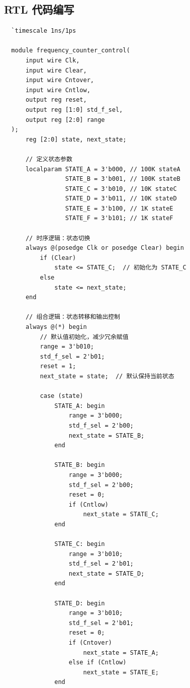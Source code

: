 \subsection{RTL 代码编写}


\begin{verbatim}
  `timescale 1ns/1ps

  module frequency_counter_control(
      input wire Clk,
      input wire Clear,
      input wire Cntover,
      input wire Cntlow,
      output reg reset,
      output reg [1:0] std_f_sel,
      output reg [2:0] range
  );
      reg [2:0] state, next_state;
  
      // 定义状态参数
      localparam STATE_A = 3'b000, // 100K stateA
                 STATE_B = 3'b001, // 100K stateB
                 STATE_C = 3'b010, // 10K stateC
                 STATE_D = 3'b011, // 10K stateD
                 STATE_E = 3'b100, // 1K stateE
                 STATE_F = 3'b101; // 1K stateF
  
      // 时序逻辑：状态切换
      always @(posedge Clk or posedge Clear) begin
          if (Clear)
              state <= STATE_C;  // 初始化为 STATE_C
          else
              state <= next_state;
      end
  
      // 组合逻辑：状态转移和输出控制
      always @(*) begin
          // 默认值初始化，减少冗余赋值
          range = 3'b010;
          std_f_sel = 2'b01;
          reset = 1;
          next_state = state;  // 默认保持当前状态
  
          case (state)
              STATE_A: begin
                  range = 3'b000;
                  std_f_sel = 2'b00;
                  next_state = STATE_B;
              end
  
              STATE_B: begin
                  range = 3'b000;
                  std_f_sel = 2'b00;
                  reset = 0;
                  if (Cntlow)
                      next_state = STATE_C;
              end
  
              STATE_C: begin
                  range = 3'b010;
                  std_f_sel = 2'b01;
                  next_state = STATE_D;
              end
  
              STATE_D: begin
                  range = 3'b010;
                  std_f_sel = 2'b01;
                  reset = 0;
                  if (Cntover)
                      next_state = STATE_A;
                  else if (Cntlow)
                      next_state = STATE_E;
              end
  

\end{verbatim}
